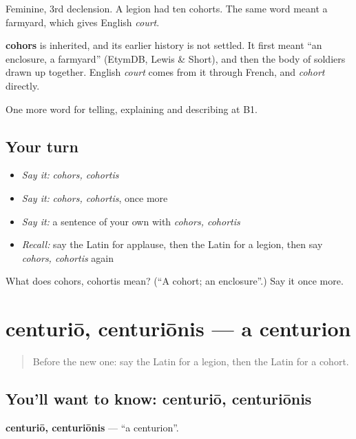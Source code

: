 Feminine, 3rd declension. A legion had ten cohorts. The same word meant a farmyard, which gives English \emph{court}.

\begin{cousinweb}
\textbf{cohors} is inherited, and its earlier history is not settled. It first meant \textquotedblleft{}an enclosure, a farmyard\textquotedblright{} (EtymDB, Lewis \& Short), and then the body of soldiers drawn up together. English \emph{court} comes from it through French, and \emph{cohort} directly.
\end{cousinweb}

\begin{grammarlens}[title={What you've built}]
One more word for telling, explaining and describing at B1.
\end{grammarlens}

\subsection*{Your turn}
\begin{itemize}
\raggedright
  \item \emph{Say it:} \emph{cohors, cohortis}
  \item \emph{Say it:} \emph{cohors, cohortis}, once more
  \item \emph{Say it:} a sentence of your own with \emph{cohors, cohortis}
  \item \emph{Recall:} say the Latin for applause, then the Latin for a legion, then say \emph{cohors, cohortis} again
\end{itemize}

\begin{tcolorbox}[breakable,colback=teal!4,colframe=teal!35!black,title={Before you move on}]
What does cohors, cohortis mean? (\textquotedblleft{}A cohort; an enclosure\textquotedblright{}.) Say it once more.
\end{tcolorbox}
\section[centuriō, centuriōnis]{centuriō, centuriōnis — a centurion}

\label{lesson:LA-C338-centurio}



\begin{quote}
Before the new one: say the Latin for a legion, then the Latin for a cohort.
\end{quote}

\subsection*{You'll want to know: centuriō, centuriōnis}
\textbf{centuriō, centuriōnis} — \textquotedblleft{}a centurion\textquotedblright{}.

